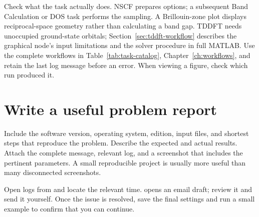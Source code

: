 Check what the task actually does. NSCF prepares options; a subsequent Band Calculation or DOS task performs the sampling. A Brillouin-zone plot displays reciprocal-space geometry rather than calculating a band gap. TDDFT needs unoccupied ground-state orbitals; Section~\ref{sec:tddft-workflow} describes the graphical node's input limitations and the solver procedure in full MATLAB\regmark{}. Use the complete workflows in Table~\ref{tab:task-catalog}, Chapter~\ref{ch:workflows}, and retain the last log message before an error. When viewing a figure, check which run produced it.

\section{Write a useful problem report}

Include the software version, operating system, edition, input files, and shortest steps that reproduce the problem. Describe the expected and actual results. Attach the complete message, relevant log, and a screenshot that includes the pertinent parameters. A small reproducible project is usually more useful than many disconnected screenshots.

Open logs from  and locate the relevant time.  opens an email draft; review it and send it yourself. Once the issue is resolved, save the final settings and run a small example to confirm that you can continue.
